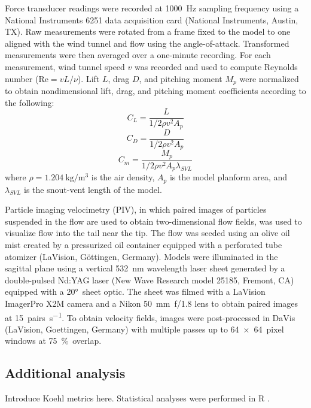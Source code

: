 \documentclass{rspublic}
\begin{document}
Force transducer readings were recorded at \SI{1000}{\hertz} sampling frequency using a National Instruments 6251 data acquisition card (National Instruments, Austin, TX).  Raw measurements were rotated from a frame fixed to the model to one aligned with the wind tunnel and flow using the angle-of-attack.  Transformed measurements were then averaged over a one-minute recording.  For each measurement, wind tunnel speed $v$ was recorded and used to compute Reynolds number ($\mbox{Re} = vL/\nu$).  Lift $L$, drag $D$, and pitching moment $M_p$ were normalized to obtain nondimensional lift, drag, and pitching moment coefficients according to the following: 
\begin{equation}
C_L = \frac{L}{1/2 \rho v^2 A_p}
\end{equation}
\begin{equation}
C_D = \frac{D}{1/2 \rho v^2 A_p}
\end{equation}
\begin{equation}
C_m = \frac{M_p}{1/2 \rho v^2 A_p \lambda_{SVL}}
\end{equation}
where $\rho=\SI{1.204}{\kg\per\meter\cubed}$ is the air density, $A_p$ is the model planform area, and $\lambda_{SVL}$ is the snout-vent length of the model. 

Particle imaging velocimetry (PIV), in which paired images of particles suspended in the flow are used to obtain two-dimensional flow fields, was used to visualize flow into the tail near the tip.  The flow was seeded using an olive oil mist created by a pressurized oil container equipped with a perforated tube atomizer (LaVision, G\"ottingen, Germany).  Models were illuminated in the sagittal plane using a vertical \SI{532}{\nano\meter} wavelength laser sheet generated by a double-pulsed Nd:YAG laser (New Wave Research model 25185, Fremont, CA) equipped with a \ang{20}\ sheet optic.  The sheet was filmed with a LaVision ImagerPro X2M camera and a Nikon \SI{50}{\milli\meter}\ f/1.8 lens to obtain paired images at \SI{15}{pairs\per\second}.  To obtain velocity fields, images were post-processed in DaVis (LaVision, Goettingen, Germany) with multiple passes up to \num{64 x 64}\ pixel windows at \SI{75}{\percent}\ overlap.

\subsection{Additional analysis}
Introduce Koehl metrics here. Statistical analyses were performed in R \citep{R:2011}.
\end{document}
